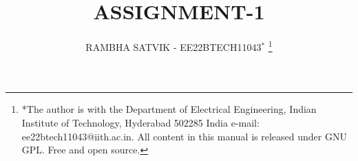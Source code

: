 \documentclass[journal,12pt,twocolumn]{IEEEtran}
\theoremstyle{remark}
\begin{document}
%




\vspace{3cm}

\title{
ASSIGNMENT-1
}
\author{ RAMBHA SATVIK - EE22BTECH11043$^{*}$%
	\thanks{*The author is with the Department
		of Electrical Engineering, Indian Institute of Technology, Hyderabad
		502285 India e-mail:  ee22btech11043@iith.ac.in. All content in this manual is released under GNU GPL.  Free and open source.}
	
}	


%
%
%

% 
%
\end{document}
